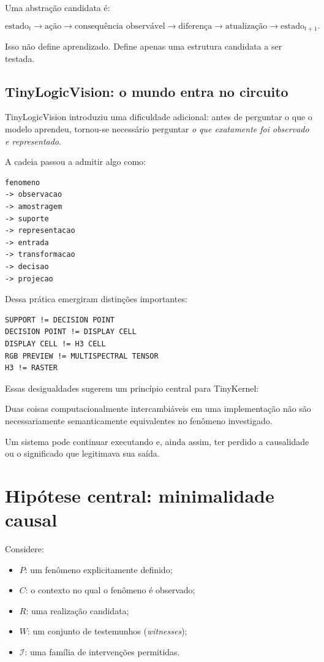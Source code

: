 \documentclass[11pt,a4paper]{article}
\begin{document}
Uma abstração candidata é:

\[
\text{estado}_t
\rightarrow
\text{ação}
\rightarrow
\text{consequência observável}
\rightarrow
\text{diferença}
\rightarrow
\text{atualização}
\rightarrow
\text{estado}_{t+1}.
\]

Isso não define aprendizado. Define apenas uma estrutura candidata a ser testada.

\subsection{TinyLogicVision: o mundo entra no circuito}

TinyLogicVision introduziu uma dificuldade adicional: antes de perguntar o que o
modelo aprendeu, tornou-se necessário perguntar \emph{o que exatamente foi
observado e representado}.

A cadeia passou a admitir algo como:

\begin{lstlisting}
fenomeno
-> observacao
-> amostragem
-> suporte
-> representacao
-> entrada
-> transformacao
-> decisao
-> projecao
\end{lstlisting}

Dessa prática emergiram distinções importantes:

\begin{lstlisting}
SUPPORT != DECISION POINT
DECISION POINT != DISPLAY CELL
DISPLAY CELL != H3 CELL
RGB PREVIEW != MULTISPECTRAL TENSOR
H3 != RASTER
\end{lstlisting}

Essas desigualdades sugerem um princípio central para TinyKernel:

\begin{thesisbox}
Duas coisas computacionalmente intercambiáveis em uma implementação não são
necessariamente semanticamente equivalentes no fenômeno investigado.

Um sistema pode continuar executando e, ainda assim, ter perdido a causalidade ou o
significado que legitimava sua saída.
\end{thesisbox}

\section{Hipótese central: minimalidade causal}

Considere:

\begin{itemize}
  \item \(P\): um fenômeno explicitamente definido;
  \item \(C\): o contexto no qual o fenômeno é observado;
  \item \(R\): uma realização candidata;
  \item \(W\): um conjunto de testemunhos (\emph{witnesses});
  \item \(\mathcal{I}\): uma família de intervenções permitidas.
\end{itemize}
\end{document}
